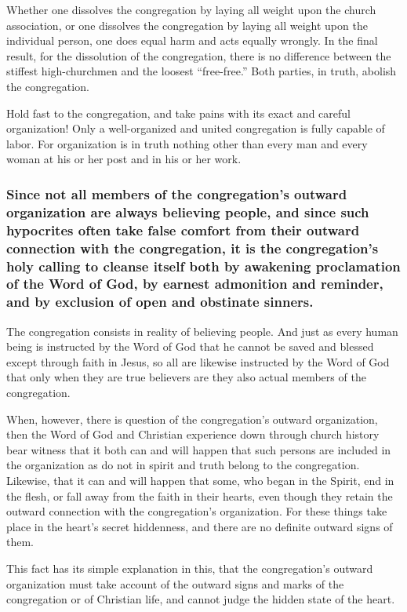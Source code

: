 Whether one dissolves the congregation by laying all weight upon the church association, or one dissolves the congregation by laying all weight upon the individual person, one does equal harm and acts equally wrongly. In the final result, for the dissolution of the congregation, there is no difference between the stiffest high-churchmen and the loosest “free-free.” Both parties, in truth, abolish the congregation.

Hold fast to the congregation, and take pains with its exact and careful organization! Only a well-organized and united congregation is fully capable of labor. For organization is in truth nothing other than every man and every woman at his or her post and in his or her work.






\subsubsection{Since not all members of the congregation’s outward organization are always believing people, and since such hypocrites often take false comfort from their outward connection with the congregation, it is the congregation’s holy calling to cleanse itself both by awakening proclamation of the Word of God, by earnest admonition and reminder, and by exclusion of open and obstinate sinners.}

The congregation consists in reality of believing people. And just as every human being is instructed by the Word of God that he cannot be saved and blessed except through faith in Jesus, so all are likewise instructed by the Word of God that only when they are true believers are they also actual members of the congregation.

When, however, there is question of the congregation’s outward organization, then the Word of God and Christian experience down through church history bear witness that it both can and will happen that such persons are included in the organization as do not in spirit and truth belong to the congregation. Likewise, that it can and will happen that some, who began in the Spirit, end in the flesh, or fall away from the faith in their hearts, even though they retain the outward connection with the congregation’s organization. For these things take place in the heart’s secret hiddenness, and there are no definite outward signs of them.

This fact has its simple explanation in this, that the congregation’s outward organization must take account of the outward signs and marks of the congregation or of Christian life, and cannot judge the hidden state of the heart.

